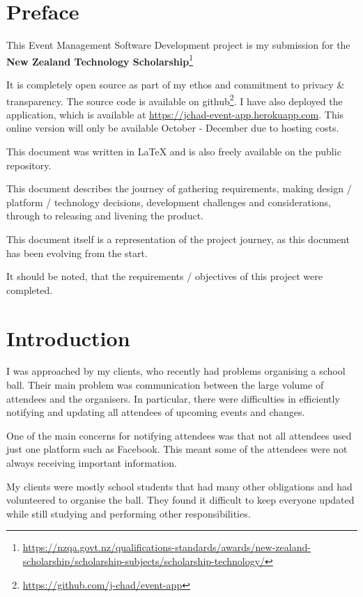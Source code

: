 \documentclass[a4paper,oneside,12pt]{report}
\begin{document}
	\tableofcontents
	\pagebreak

	\chapter{Preface}
	This Event Management Software Development project is my submission for the \textbf{New Zealand Technology Scholarship}\footnote{\url{https://nzqa.govt.nz/qualifications-standards/awards/new-zealand-scholarship/scholarship-subjects/scholarship-technology/}}

	It is completely open source as part of my ethos and commitment to privacy \& transparency. The source code is available on github\footnote{\url{https://github.com/j-chad/event-app}}.  I have also deployed the application, which is available at \url{https://jchad-event-app.herokuapp.com}. This online version will only be available October - December due to hosting costs.

	This document was written in \LaTeX{} and is also freely available on the public repository.
	
	This document describes the journey of gathering requirements, making design / platform / technology decisions, development challenges and considerations, through to releasing and livening the product.
	
	This document itself is a representation of the project journey, as this document has been evolving from the start.
	
	It should be noted, that the requirements / objectives of this project were completed.

	\chapter{Introduction}
	I was approached by my clients, who recently had problems organising a school ball. Their main problem was communication between the large volume of attendees and the organisers. In particular, there were difficulties in efficiently notifying and updating all attendees of upcoming events and changes.

    One of the main concerns for notifying attendees was that not all attendees used just one platform such as Facebook. This meant some of the attendees were not always receiving important information.

    My clients were mostly school students that had many other obligations and had volunteered to organise the ball. They found it difficult to keep everyone updated while still studying and performing other responsibilities.
\end{document}
